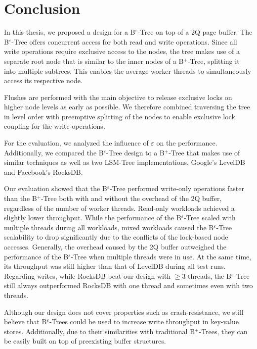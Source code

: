 
\chapter{Conclusion}\label{chapter:conclusion}

In this thesis, we proposed a design for a B$^\varepsilon$-Tree on top of a 2Q page buffer. The B$^\varepsilon$-Tree offers concurrent access for both read and write operations. Since all write operations require exclusive access to the nodes, the tree makes use of a separate root node that is similar to the inner nodes of a B$^+$-Tree, splitting it into multiple subtrees. This enables the average worker threads to simultaneously access its respective node. 

Flushes are performed with the main objective to release exclusive locks on higher node levels as early as possible. We therefore combined traversing the tree in level order with preemptive splitting of the nodes to enable exclusive lock coupling for the write operations.

For the evaluation, we analyzed the influence of $\varepsilon$ on the performance. Additionally, we compared the B$^\varepsilon$-Tree design to a B$^+$-Tree that makes use of similar techniques as well as two LSM-Tree implementations, Google's LevelDB and Facebook's RocksDB.

Our evaluation showed that the B$^\varepsilon$-Tree performed write-only operations faster than the B$^+$-Tree both with and without the overhead of the 2Q buffer, regardless of the number of worker threads. Read-only workloads achieved a slightly lower throughput. While the performance of the B$^\varepsilon$-Tree scaled with multiple threads during all workloads, mixed workloads caused the B$^\varepsilon$-Tree scalability to drop significantly due to the conflicts of the lock-based node accesses.\newline
Generally, the overhead caused by the 2Q buffer outweighed the performance of the B$^\varepsilon$-Tree when multiple threads were in use. At the same time, its throughput was still higher than that of LevelDB during all test runs. Regarding writes, while RocksDB beat our design with $\geq 3$ threads, the B$^\varepsilon$-Tree still always outperformed RocksDB with one thread and sometimes even with two threads.

Although our design does not cover properties such as crash-resistance, we still believe that B$^\varepsilon$-Trees could be used to increase write throughput in key-value stores. Additionally, due to their similarities with traditional B$^+$-Trees, they can be easily built on top of preexisting buffer structures.